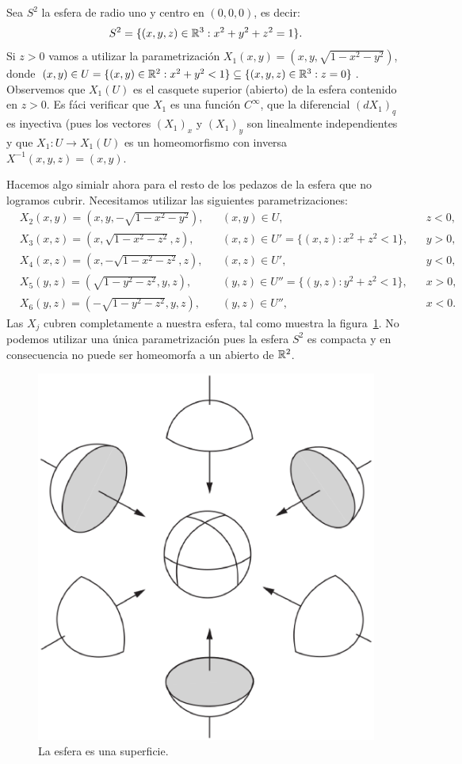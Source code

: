 \begin{example}
	Sea $S^2$ la esfera de radio uno y centro en $(0,0,0)$, es decir:
	\[
		S^2=\{(x,y,z)\in\mathbb{R}^3:x^2+y^2+z^2=1\}.
	\]
	Si $z>0$ vamos a utilizar la parametrización
	$X_1(x,y)=(x,y,\sqrt{1-x^2-y^2})$, donde $(x,y)\in
	U=\{(x,y)\in\mathbb{R}^2:x^2+y^2<1\}\subseteq\{(x,y,z)\in\mathbb{R}^3:z=0\}$. Observemos
	que $X_1(U)$ es el casquete superior (abierto) de la esfera contenido en
	$z>0$. Es fáci verificar que $X_1$ es una función $C^{\infty}$, que la
	diferencial $(dX_1)_q$ es inyectiva (pues los vectores $(X_1)_x$ y
	$(X_1)_y$ son linealmente independientes y que $X_1\colon U\to X_1(U)$ es
	un homeomorfismo con inversa $X^{-1}(x,y,z)=(x,y)$.

	Hacemos algo simialr ahora para el resto de los pedazos de la esfera que no
	logramos cubrir. Necesitamos utilizar las siguientes parametrizaciones:
	\begin{align*}
		&X_2(x,y)=(x,y,-\sqrt{1-x^2-y^2}), && (x,y)\in U, && z<0,\\
		&X_3(x,z)=(x,\sqrt{1-x^2-z^2},z), && (x,z)\in U'=\{(x,z):x^2+z^2<1\}, && y>0,\\
		&X_4(x,z)=(x,-\sqrt{1-x^2-z^2},z), && (x,z)\in U', && y<0,\\
		&X_5(y,z)=(\sqrt{1-y^2-z^2},y,z), && (y,z)\in U''=\{(y,z):y^2+z^2<1\}, && x>0,\\
		&X_6(y,z)=(-\sqrt{1-y^2-z^2},y,z), && (y,z)\in U'', && x<0.
	\end{align*}
	Las $X_j$ cubren completamente a nuestra esfera, tal como muestra la
	figura~\ref{fig:esfera}.  No podemos utilizar una única parametrización
	pues la esfera $S^2$ es compacta y en consecuencia no puede ser homeomorfa
	a un abierto de $\mathbb{R}^2$.
	\begin{figure}
		\centering
    	\includegraphics[scale=0.3]{eps/esfera}
		\caption{La esfera es una superficie.}
		\label{fig:esfera}
	\end{figure}
\end{example}

